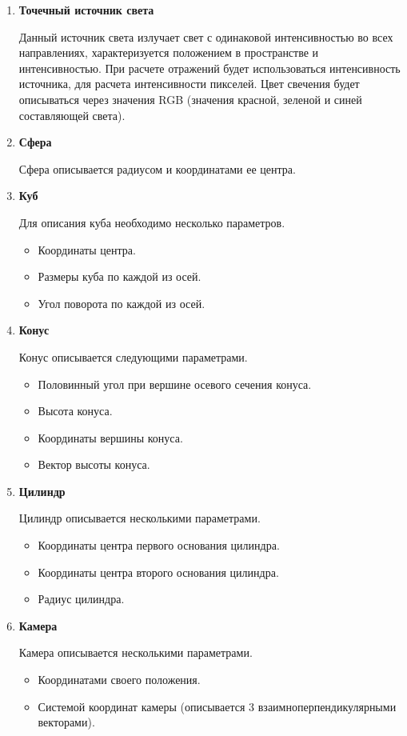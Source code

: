 \begin{enumerate}
	\item  \textbf{Точечный источник света}
	
	Данный источник света излучает свет с одинаковой интенсивностью во всех направлениях, характеризуется положением в пространстве и интенсивностью.
	При расчете отражений будет использоваться интенсивность источника, для расчета интенсивности пикселей. Цвет свечения будет описываться через значения RGB (значения красной, зеленой и синей составляющей света).
	
	
	
	\item \textbf{Сфера}
	
	Сфера описывается радиусом и координатами ее центра.
	
	\item  \textbf{Куб}
	
	Для описания куба необходимо несколько параметров.
	\begin{itemize}
		\item Координаты центра.
		\item Размеры куба по каждой из осей.
		\item Угол поворота по каждой из осей.
	\end{itemize}
	\item  \textbf{Конус}
	
	Конус описывается следующими параметрами.
	\begin{itemize}
		\item Половинный угол при вершине осевого сечения конуса.
		\item Высота конуса.
		\item Координаты вершины конуса.
		\item Вектор высоты конуса.
	\end{itemize}
	
	\item  \textbf{Цилиндр}
	
	Цилиндр описывается несколькими параметрами.
	\begin{itemize}
		\item Координаты центра первого основания цилиндра.
		\item Координаты центра второго основания цилиндра.
		\item Радиус цилиндра.
	\end{itemize}
	
	
	\item \textbf{Камера}
	
	Камера описывается несколькими параметрами.
	\begin{itemize}
		\item Координатами своего положения.
		\item Системой координат камеры (описывается 3 взаимноперпендикулярными векторами).
	\end{itemize}
\end{enumerate}

